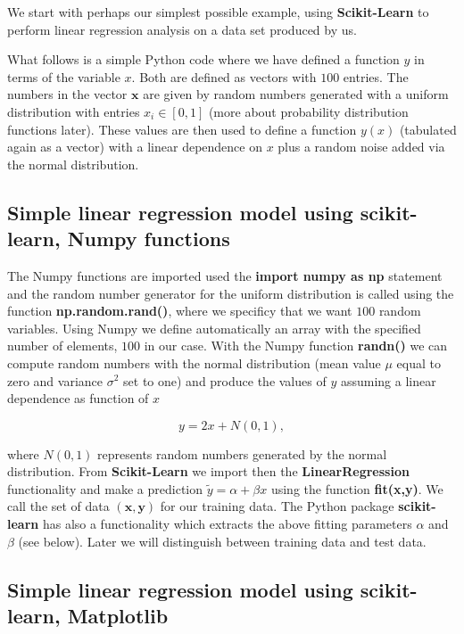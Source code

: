 \documentclass[%
oneside,                 %
final,                   %
10pt]{article}
\begin{document}
We start with perhaps our simplest possible example, using \textbf{Scikit-Learn} to perform linear regression analysis on a data set produced by us. 

What follows is a simple Python code where we have defined a function
$y$ in terms of the variable $x$. Both are defined as vectors with  $100$ entries. 
The numbers in the vector $\bm{x}$ are given
by random numbers generated with a uniform distribution with entries
$x_i \in [0,1]$ (more about probability distribution functions
later). These values are then used to define a function $y(x)$
(tabulated again as a vector) with a linear dependence on $x$ plus a
random noise added via the normal distribution.


\subsection{Simple linear regression model using \textbf{scikit-learn}, Numpy functions}

The Numpy functions are imported used the \textbf{import numpy as np}
statement and the random number generator for the uniform distribution
is called using the function \textbf{np.random.rand()}, where we specificy
that we want $100$ random variables.  Using Numpy we define
automatically an array with the specified number of elements, $100$ in
our case.  With the Numpy function \textbf{randn()} we can compute random
numbers with the normal distribution (mean value $\mu$ equal to zero and
variance $\sigma^2$ set to one) and produce the values of $y$ assuming a linear
dependence as function of $x$

\[
y = 2x+N(0,1),
\]

where $N(0,1)$ represents random numbers generated by the normal
distribution.  From \textbf{Scikit-Learn} we import then the
\textbf{LinearRegression} functionality and make a prediction $\tilde{y} =
\alpha + \beta x$ using the function \textbf{fit(x,y)}. We call the set of
data $(\bm{x},\bm{y})$ for our training data. The Python package
\textbf{scikit-learn} has also a functionality which extracts the above
fitting parameters $\alpha$ and $\beta$ (see below). Later we will
distinguish between training data and test data.

\subsection{Simple linear regression model using \textbf{scikit-learn}, Matplotlib}
\end{document}
